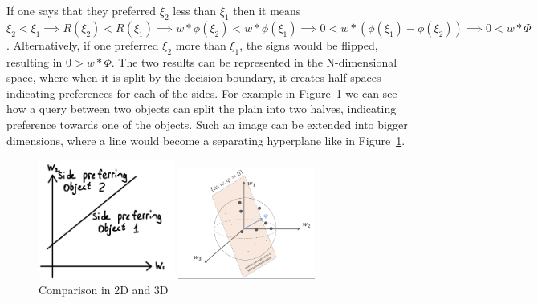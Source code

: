 \documentclass[
  letterpaper,
  numbers=noenddot,
  DIV=11,
  oneside]{scrreprt}
\theoremstyle{remark}
\begin{document}
If one says that they preferred \(\xi_2\) less than \(\xi_1\) then it
means
\(\xi_2 < \xi_1 \implies R(\xi_2) < R(\xi_1) \implies w * \phi(\xi_2) < w * \phi(\xi_1) \implies 0 < w * (\phi(\xi_1) - \phi(\xi_2)) \implies 0 < w * \Phi\).
Alternatively, if one preferred \(\xi_2\) more than \(\xi_1\), the signs
would be flipped, resulting in \(0 > w * \Phi\). The two results can be
represented in the N-dimensional space, where when it is split by the
decision boundary, it creates half-spaces indicating preferences for
each of the sides. For example in Figure~\ref{fig-2dcomp} we can see how
a query between two objects can split the plain into two halves,
indicating preference towards one of the objects. Such an image can be
extended into bigger dimensions, where a line would become a separating
hyperplane like in Figure~\ref{fig-2dcomp}.

\begin{figure}

\begin{minipage}{0.50\linewidth}

\includegraphics[width=0.4\textwidth,height=\textheight]{src/Figures/2D-comp.jpg}

\end{minipage}%
%
\begin{minipage}{0.50\linewidth}

\includegraphics[width=0.4\textwidth,height=\textheight]{src/Figures/3D-comp.png}

\end{minipage}%

\caption{\label{fig-2dcomp}Comparison in 2D and 3D}

\end{figure}%
\end{document}
